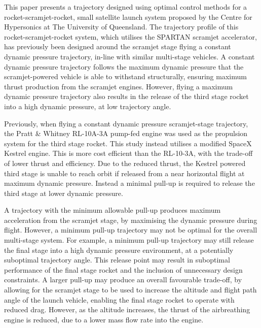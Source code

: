 \documentclass[journal]{new-aiaa}
\begin{document}
This paper presents a trajectory designed using optimal control methods for a rocket-scramjet-rocket, small satellite launch system proposed by the Centre for Hypersonics at The University of Queensland\cite{Preller2017}. 
The trajectory profile of this rocket-scramjet-rocket system, which utilises the SPARTAN scramjet accelerator, has previously been designed around the scramjet stage flying a constant dynamic pressure trajectory\cite{Preller2017}, in-line with similar multi-stage vehicles\cite{Kimura1999,Olds1998}.
 A constant dynamic pressure trajectory follows the maximum dynamic pressure that the scramjet-powered vehicle is able to withstand structurally, ensuring maximum thrust production from the scramjet engines. However, flying a maximum dynamic pressure trajectory also results in the release of the third stage rocket into a high dynamic pressure, at low trajectory angle. 


 Previously, when flying a constant dynamic pressure scramjet-stage trajectory, the Pratt \& Whitney RL-10A-3A pump-fed engine was used as the propulsion system for the third stage rocket\cite{Preller2017}. This study instead utilises a modified SpaceX Kestrel engine\cite{Vehicle2008}. This is more cost efficient than the RL-10-3A, with the trade-off of lower thrust and efficiency. Due to the reduced thrust, the Kestrel powered third stage is unable to reach orbit if released from a near horizontal flight at maximum dynamic pressure. Instead a minimal pull-up is required to release the third stage at lower dynamic pressure.

 A trajectory with the minimum allowable pull-up produces maximum acceleration from the scramjet stage, by maximising the dynamic pressure during flight. However, a minimum pull-up trajectory may not be optimal for the overall multi-stage system. 
 For example, a minimum pull-up trajectory may still release the final stage into a high dynamic pressure environment, at a potentially suboptimal trajectory angle. This release point may result in suboptimal performance of the final stage rocket  and the inclusion of unnecessary design constraints. 
 A larger pull-up may produce an overall favourable trade-off, by allowing for the scramjet stage to be used to increase the altitude and flight path angle of the launch vehicle, enabling the final stage rocket to operate with reduced drag.
 However, as the altitude increases, the thrust of the airbreathing engine is reduced, due to a lower mass flow rate into the engine. 

 
  
\end{document}
